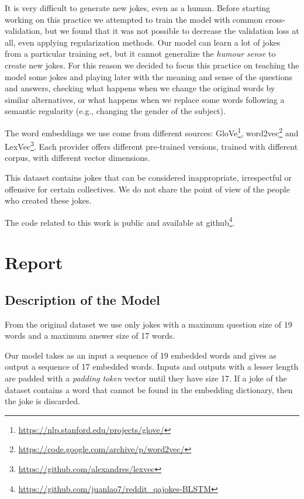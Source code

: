 \documentclass[]{article}
\begin{document}
	It is very difficult to generate new jokes, even as a human. Before starting working on this practice we attempted to train the model with common cross-validation, but we found that it was not possible to decrease the validation loss at all, even applying regularization methods. Our model can learn a lot of jokes from a particular training set, but it cannot generalize the \emph{humour sense} to create new jokes. For this reason we decided to focus this practice on teaching the model some jokes and playing later with the meaning and sense of the questions and answers, checking what happens when we change the original words by similar alternatives, or what happens when we replace some words following a semantic regularity (e.g., changing the gender of the subject).
	
	The word embeddings we use come from different sources: GloVe\footnote{\url{https://nlp.stanford.edu/projects/glove/}}, word2vec\footnote{\url{https://code.google.com/archive/p/word2vec/}} and LexVec\footnote{\url{https://github.com/alexandres/lexvec}}. Each provider offers different pre-trained versions, trained with different corpus, with different vector dimensions.
	
	This dataset contains jokes that can be considered inappropriate, irrespectful or offensive for certain collectives. We do not share the point of view of the people who created these jokes.
	
	The code related to this work is public and available at github\footnote{\url{https://github.com/juanlao7/reddit_qajokes-BLSTM}}.
	
	\section{Report}
	
	\subsection{Description of the Model}
	
	From the original dataset we use only jokes with a maximum question size of 19 words and a maximum answer size of 17 words.
	
	Our model takes as an input a sequence of 19 embedded words and gives as output a sequence of 17 embedded words. Inputs and outputs with a lesser length are padded with a \emph{padding token} vector until they have size 17. If a joke of the dataset contains a word that cannot be found in the embedding dictionary, then the joke is discarded.
	
\end{document}
